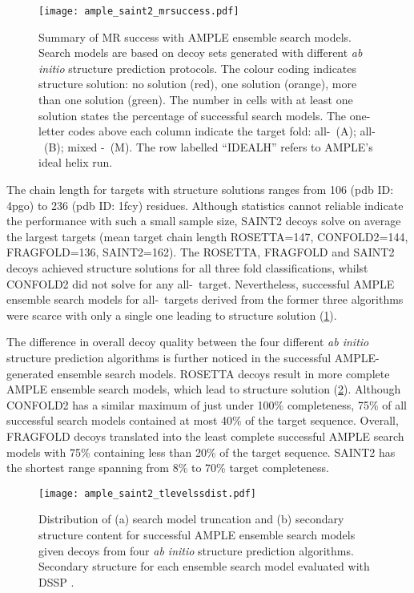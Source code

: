\begin{figure}[H]
    \centering
    \texttt{[image: ample\_saint2\_mrsuccess.pdf]}
    \caption[Summary of MR success with AMPLE ensemble search models.]{Summary of MR success with AMPLE ensemble search models. Search models are based on decoy sets generated with different \textit{ab initio} structure prediction protocols. The colour coding indicates structure solution: no solution (red), one solution (orange), more than one solution (green). The number in cells with at least one solution states the percentage of successful search models. The one-letter codes above each column indicate the target fold: all-\textalpha\ (A); all-\textbeta\ (B); mixed \textalpha-\textbeta\ (M). The row labelled ``IDEALH'' refers to AMPLE's ideal helix run.}
    \label{fig:ample_saint2_mrsuccess}
\end{figure}

The chain length for targets with structure solutions ranges from 106 (\gls{pdb} ID: 4pgo) to 236 (\gls{pdb} ID: 1fcy) residues. Although statistics cannot reliable indicate the performance with such a small sample size, SAINT2 decoys solve on average the largest targets (mean target chain length ROSETTA=147, CONFOLD2=144, FRAGFOLD=136,  SAINT2=162). The ROSETTA, FRAGFOLD and SAINT2 decoys achieved structure solutions for all three fold classifications, whilst CONFOLD2 did not solve for any all-\textbeta\ target. Nevertheless, successful AMPLE ensemble search models for all-\textbeta\ targets derived from the former three algorithms were scarce with only a single one leading to structure solution (\cref{fig:ample_saint2_mrsuccess}).

The difference in overall decoy quality between the four different \textit{ab initio} structure prediction algorithms is further noticed in the successful AMPLE-generated ensemble search models. ROSETTA decoys result in more complete AMPLE ensemble search models, which lead to structure solution (\cref{fig:ample_saint2_tlevelssdist}). Although CONFOLD2 has a similar maximum of just under 100\% completeness, 75\% of all successful search models contained at most 40\% of the target sequence. Overall, FRAGFOLD decoys translated into the least complete successful AMPLE search models with 75\% containing less than 20\% of the target sequence. SAINT2 has the shortest range spanning from 8\% to 70\% target completeness.

\begin{figure}[H]
    \centering
    \texttt{[image: ample\_saint2\_tlevelssdist.pdf]}
    \caption[Distribution of search model truncation and secondary structure content]{Distribution of (a) search model truncation and (b) secondary structure content for successful AMPLE ensemble search models given decoys from four \textit{ab initio} structure prediction algorithms. Secondary structure for each ensemble search model evaluated with DSSP \cite{Frishman1995-si}.}
    \label{fig:ample_saint2_tlevelssdist}
\end{figure}

